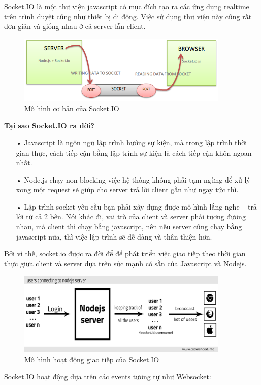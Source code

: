 Socket.IO là một thư viện javascript có mục đích tạo ra các ứng dụng realtime trên trình duyệt cũng như thiết bị di động. Việc sử dụng thư viện này cũng rất đơn giản và giống nhau ở cả server lẫn client. 
\begin{figure}[H]
	\centering    
	\includegraphics[width=0.9\textwidth]{socketio}
	\caption[Mô hình cơ bản của Socket.IO]{Mô hình cơ bản của Socket.IO}
	\label{fig: socketio}
\end{figure}
\textbf{Tại sao Socket.IO ra đời?}

\begin{itemize}
	\item[•]Javascript là ngôn ngữ lập trình hướng sự kiện, mà trong lập trình thời gian thực, cách tiếp cận bằng lập trình sự kiện là cách tiếp cận khôn ngoan nhất.
	\item[•]Node.js chạy non-blocking việc hệ thống không phải tạm ngừng để xử lý xong một request sẽ giúp cho server trả lời client gần như ngay tức thì.
	\item[•]Lập trình socket yêu cầu bạn phải xây dựng được mô hình lắng nghe – trả lời từ cả 2 bên. Nói khác đi, vai trò của client và server phải tương đương nhau, mà client thì chạy bằng javascript, nên nếu server cũng chạy bằng javascript nữa, thì việc lập trình sẽ dễ dàng và thân thiện hơn.
\end{itemize}
Bởi vì thế, socket.io được ra đời để để phát triển việc giao tiếp theo thời gian thực giữa client và server dựa trên sức mạnh có sẵn của Javascript và Nodejs.
\begin{figure}[H]
	\centering    
	\includegraphics[width=0.9\textwidth]{socketio2}
	\caption[Mô hình hoạt động giao tiếp của Socket.IO]{Mô hình hoạt động giao tiếp của Socket.IO}
	\label{fig: socketio2}
\end{figure}
Socket.IO hoạt động dựa trên các events tương tự như Websocket:

